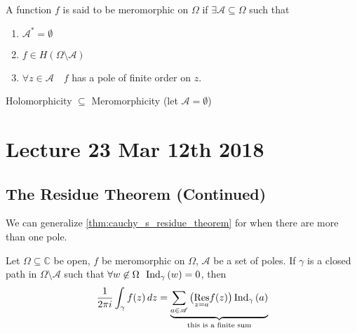 \documentclass[11pt, oneside]{book}
\begin{document}
\begin{defn}\label{defn:meromorphic_functions}
  A function $f$ is said to be meromorphic on $\Omega$ if $\exists \mathscr{A} \subseteq \Omega$ such that
  \begin{enumerate}
    \item $\mathscr{A}^* = \emptyset$
    \item $f \in H(\Omega \setminus \mathscr{A})$
    \item $\forall z \in \mathscr{A} \quad f$ has a pole of finite order on $z$.
  \end{enumerate}
\end{defn}

\begin{remark}
  Holomorphicity $\subseteq$ Meromorphicity (let $\mathscr{A} = \emptyset$)
\end{remark}



\chapter{Lecture 23 Mar 12th 2018}
  \label{chapter:lecture_23_mar_12th_2018}

\section{The Residue Theorem (Continued)} %
\label{sec:the_residue_theorem_continued}

We can generalize \cref{thm:cauchy_s_residue_theorem} for when there are more than one pole.

\begin{thm}\label{thm:cauchy_s_residue_theorem_generalized}
  Let $\Omega \subseteq \mathbb{C}$ be open, $f$ be meromorphic on $\Omega$, $\mathscr{A}$ be a set of poles. If $\gamma$ is a closed path in $\Omega \setminus \mathscr{A}$ such that $\forall w \not\in \Omega \enspace \ind{w}{\gamma} = 0$, then
  \begin{equation*}
    \frac{1}{2 \pi i} \int_{\gamma} f(z) \dif{z} = \underbrace{\sum_{a \in \mathscr{A}} \big( \res{f(z)}{z = a} \big) \ind{a}{\gamma}}_{\text{this is a finite sum}}
  \end{equation*}
\end{thm}
\end{document}
